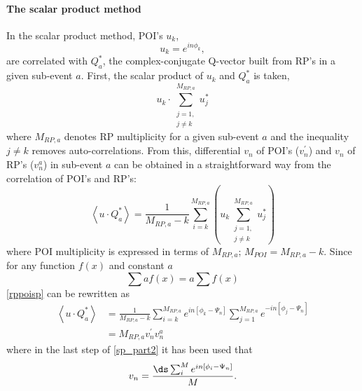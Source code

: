 \documentclass[a5paper]{book}
\numberwithin{equation}{subsection}
\begin{document}
\paragraph{The scalar product method}
In the scalar product method, POI's $u_k$,
\begin{equation}\label{spderiv}
	u_k = e^{i n \phi_k},
\end{equation}
are correlated with $Q^*_a$, the complex-conjugate Q-vector built from RP's in a given sub-event $a$. First, the scalar product of $u_k$ and $Q^*_a$ is taken,
\begin{equation}
	u_k \cdotp \sum_{\substack{ j=1,\\j \neq k}}^{M_{RP, a}} u^*_j
\end{equation}
where $M_{RP, a}$ denotes RP multiplicity for a given sub-event $a$ and the inequality $j \neq k$ removes auto-correlations. From this, differential $v_n$ of POI's ($v_n^{\prime}$) and $v_n$ of RP's ($v_n^a$) in sub-event $a$ can be obtained in a straightforward way from the correlation of POI's and RP's:
\begin{equation}\label{rppoisp}
	\left< u \cdotp Q^*_a \right> = \frac{1}{M_{RP, a}-k}\sum_{i=k}^{M_{RP, a}} \left( u_k \sum_{\substack{ j=1,\\j \neq k}}^{M_{RP, a}} u^*_j \right)
\end{equation}
where POI multiplicity is expressed in terms of $M_{RP, a}$; $M_{POI} = M_{RP, a} - k$. Since for any function $f(x)$ and constant $a$
\begin{equation}
	\sum a f(x) = a \sum f(x) 
\end{equation}
\ref{rppoisp} can be rewritten as
\begin{align}\label{sp_part2}
	\left< u \cdotp Q^*_a \right> & = \frac{1}{M_{RP, a}-k}\sum_{i=k}^{M_{RP, a}} e^{i n [\phi_k - \Psi_n]} \sum_{j=1}^{M_{RP, a}} e^{- i n [\phi_j - \Psi_n]} \\
	                              & = M_{RP, a} v^{\prime}_n v_n^a \nonumber                                                                                   
\end{align}
where in the last step of \ref{sp_part2} it has been used that
\begin{equation}
	v_n = \frac{\ds \sum_i^M e^{in[\phi_i - \Psi_n]} }{M}.
\end{equation}
\end{document}
